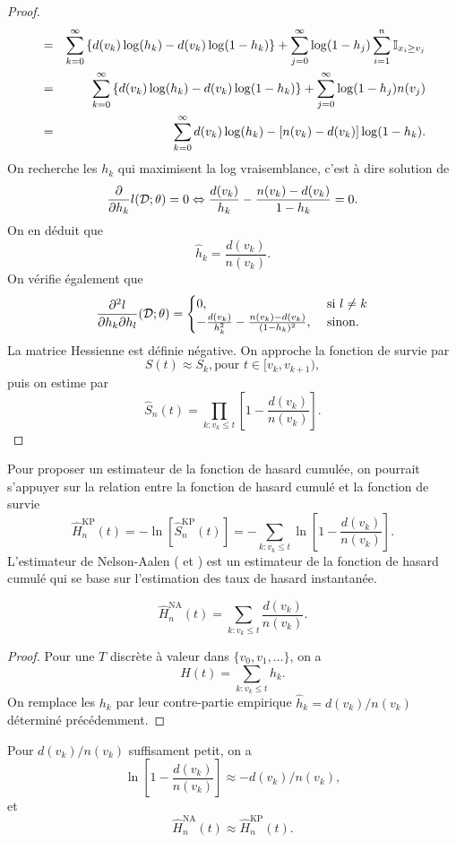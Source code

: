 \begin{proof}
\begin{eqnarray*}
&=&\sum_{k=0}^\infty \left\{d(v_k)\log(h_k)-d(v_k)\log(1-h_k)\right\} + \sum_{j=0}^\infty\log(1-h_j)\sum_{i = 1}^n\mathbb{I}_{x_i\geq v_j}\\
&=&\sum_{k=0}^\infty \left\{d(v_k)\log(h_k)-d(v_k)\log(1-h_k)\right\} + \sum_{j=0}^\infty\log(1-h_j)n(v_j)\\
&=&\sum_{k=0}^\infty d(v_k)\log(h_k)-[n(v_k) - d(v_k)]\log(1-h_k).\\
\end{eqnarray*}
On recherche les $h_k$ qui maximisent la log vraisemblance, c'est à dire solution de
$$
\frac{\partial}{\partial h_k}l(\Data;\theta) = 0\Leftrightarrow \frac{d(v_k)}{h_k}-\frac{n(v_k)-d(v_k)}{1-h_k}=0.
$$
On en déduit que
$$
\widehat{h}_k = \frac{d(v_k)}{n(v_k)}.
$$
On vérifie également que 
$$
\frac{\partial^2 l}{\partial h_k\partial h_l} (\Data;\theta)=\begin{cases}
0,&\text{ si }l\neq k\\
-\frac{d(v_k)}{h_k^2}-\frac{n(v_k)-d(v_k)}{(1-h_k)^2},&\text{ sinon.}

\end{cases}
$$
La matrice Hessienne est définie négative. On approche la fonction de survie par 
$$
S(t)\approx S_k,\text{pour }t\in [v_k,v_{k+1}),
$$
puis on estime par 
$$
\widehat{S}_n(t)=\prod_{k:v_k\leq t}\left[1-\frac{d(v_k)}{n(v_k)}\right].
$$
\end{proof}
Pour proposer un estimateur de la fonction de hasard cumulée, on pourrait s'appuyer sur la relation entre la fonction de hasard cumulé et la fonction de survie
$$
\widehat{H}^{\text{KP}}_n(t) = -\ln\left[\widehat{S}^{\text{KP}}_n(t)\right] = -\sum_{k:v_k\leq t}\ln\left[1-\frac{d(v_k)}{n(v_k)}\right].
$$
L'estimateur de Nelson-Aalen (\citet{Nelson1972} et \citet{Aalen1978}) est un estimateur de la fonction de hasard cumulé qui se base sur l'estimation des taux de hasard instantanée.
\begin{coro}
$$
\widehat{H}_n^{\text{NA}}(t) = \sum_{k:v_k\leq t}\frac{d(v_k)}{n(v_k)}.
$$
\end{coro}
\begin{proof}
Pour une \va $T$ discrète à valeur dans $\{v_0, v_1,\ldots\}$, on a 
$$
H(t) = \sum_{k:v_k\leq t} h_k.
$$
On remplace les $h_k$ par leur contre-partie empirique $\widehat{h}_k = d(v_k)/n(v_k)$ déterminé précédemment.
\end{proof}
\begin{remark}
Pour $d(v_k)/n(v_k)$ suffisament petit, on a 
$$
\ln\left[1-\frac{d(v_k)}{n(v_k)}\right]\approx -d(v_k)/n(v_k),
$$ 
et 
$$\widehat{H}_n^{\text{NA}}(t)\approx \widehat{H}_n^{\text{KP}}(t).$$
\end{remark}

